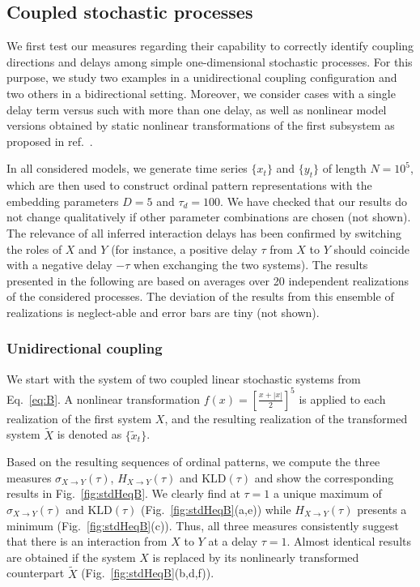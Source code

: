 \documentclass[12pt,aip,cha,reprint,nofootinbib]{revtex4-1}
\begin{document}
\subsection{Coupled stochastic processes} \label{sec:GCs}
We first test our measures regarding their capability to correctly identify coupling directions and delays among simple one-dimensional stochastic processes. For this purpose, we study two examples in a unidirectional coupling configuration and two others in a bidirectional setting. Moreover, we consider cases with a single delay term versus such with more than one delay, as well as nonlinear model versions obtained by static nonlinear transformations of the first subsystem as proposed in ref.~\cite{LiPRE2018}.

In all considered models, we generate time series $\{ x_t \}$ and $\{ y_t \}$ of length $N=10^{5}$, which are then used to construct ordinal pattern representations with the embedding parameters $D = 5$ and $\tau_d = 100$. We have checked that our results do not change qualitatively if other parameter combinations are chosen (not shown). The relevance of all inferred interaction delays has been confirmed by switching the roles of $X$ and $Y$ (for instance, a positive delay $\tau$ from $X$ to $Y$ should coincide with a negative delay $-\tau$ when exchanging the two systems). The results presented in the following are based on averages over 20 independent realizations of the considered processes. {\color{red}The deviation of the results from this ensemble of realizations is neglect-able and error bars are tiny (not shown). }

\subsubsection{Unidirectional coupling}

We start with the system of two coupled linear stochastic systems from Eq.~\eqref{eq:B}. A nonlinear transformation $f(x) = \left[\frac{x + | x |}{2}\right]^{5}$ is applied to each realization of the first system $X$, and the resulting realization of the transformed system $\tilde{X}$ is denoted as $\{\tilde{x}_t\}$. 

Based on the resulting sequences of ordinal patterns, we compute the three measures $\sigma_{X \to Y}(\tau)$, $H_{X \to Y}(\tau)$ and $\text{KLD}(\tau)$ and show the corresponding results in Fig.~\ref{fig:stdHeqB}. We clearly find at $\tau = 1$ a unique maximum of $\sigma_{X \to Y}(\tau)$ and $\text{KLD}(\tau)$ (Fig.~\ref{fig:stdHeqB}(a,e)) while $H_{X\to Y}(\tau)$ presents a minimum (Fig.~\ref{fig:stdHeqB}(c)). Thus, all three measures consistently suggest that there is an interaction from $X$ to $Y$ at a delay $\tau = 1$. Almost identical results are obtained if the system $X$ is replaced by its nonlinearly transformed counterpart $\tilde{X}$ (Fig.~\ref{fig:stdHeqB}(b,d,f)). 
\end{document}
